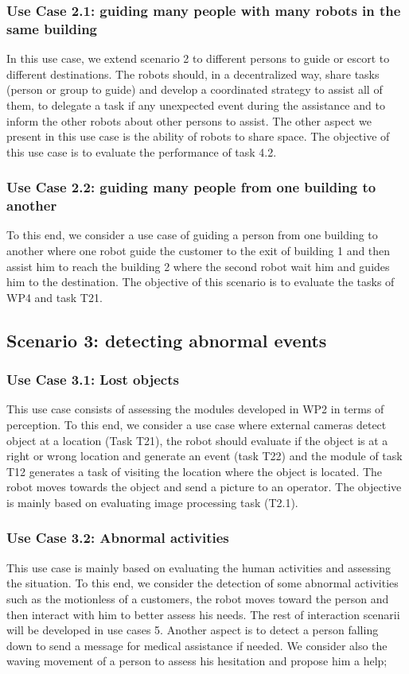 \subsubsection*{Use Case 2.1: guiding many people with many robots in the same building}
In this use case, we extend  scenario 2 to different persons to guide or escort to different destinations. The robots should, in a decentralized way, share tasks (person or group to guide) and develop a coordinated strategy to assist all of them, to delegate a task if any unexpected event during the assistance and to inform the other robots about other persons to assist. The other aspect we present in this use case is the ability of robots to share space. 
The objective of this use case is to evaluate the performance of task 4.2.

\subsubsection*{Use Case 2.2: guiding many people from one building to another}
To this end,  we consider a use case  of guiding a person from one building to another where one robot guide the customer to the exit of building 1 and then  assist him to reach the building 2 where the second robot wait him and guides him to the destination. 
The objective of this scenario is to evaluate the tasks of WP4 and task T21. 

\subsection{Scenario 3: detecting abnormal events}

\subsubsection*{Use Case 3.1: Lost objects}
This use case consists of assessing the modules developed in WP2 in terms of perception. To this end, we consider a use case where external cameras detect object at a location (Task T21), the robot should evaluate if the  object is at a right or wrong location and generate an event (task T22) and the module of task T12 generates a task of visiting the location where the object is located. The robot moves towards the object and send a picture to an operator. 
The objective is mainly based on evaluating image processing task (T2.1).

\subsubsection*{Use Case 3.2: Abnormal activities}
This use case is mainly based on evaluating the human activities and assessing the situation. To this end, we consider the detection of some abnormal activities such as 
 the motionless of a customers, the robot moves toward the person and then interact with him to better assess his needs. The rest of interaction scenarii will be developed in use cases 5. Another aspect is to detect a person falling down to send a message for medical assistance if needed. We consider also the waving movement of a person to assess his hesitation and propose him a help;  

